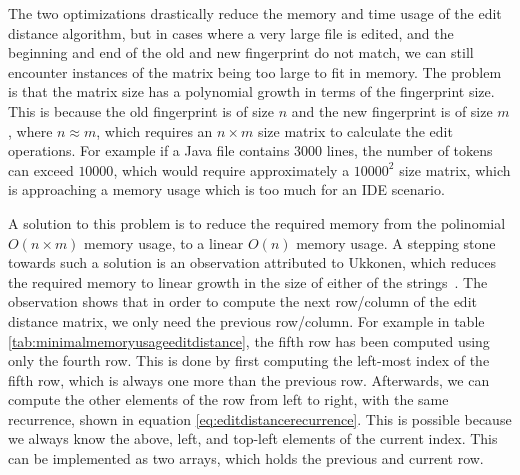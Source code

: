 The two optimizations drastically reduce the memory and time usage of the edit distance
algorithm, but in cases where a very large file is edited, and the beginning and end of
the old and new fingerprint do not match, we can still encounter instances of the matrix
being too large to fit in memory. The problem is that the matrix size has a polynomial
growth in terms of the fingerprint size. This is because the old fingerprint is of size
$n$ and the new fingerprint is of size $m$, where $n \approx m$, which requires an $n
\times m$ size matrix to calculate the edit operations. For example if a Java file
contains $3000$ lines, the number of tokens can exceed $10000$, which would require
approximately a $10000^2$ size matrix, which is approaching a memory usage which is too
much for an IDE scenario.

A solution to this problem is to reduce the required memory from the polinomial $O(n \times m)$
memory usage, to a linear $O(n)$ memory usage. A stepping stone towards such a solution is
an observation attributed to Ukkonen, which reduces the required memory to linear growth
in the size of either of the strings~\cite{UkkonenEditDistance}. The observation shows
that in order to compute the next row/column of the edit distance matrix, we only need the
previous row/column. For example in table \ref{tab:minimalmemoryusageeditdistance}, the
fifth row has been computed using only the fourth row. This is done by first computing the
left-most index of the fifth row, which is always one more than the previous row.
Afterwards, we can compute the other elements of the row from left to right, with the same
recurrence, shown in equation \ref{eq:editdistancerecurrence}. This is possible because we
always know the above, left, and top-left elements of the current index. This can be
implemented as two arrays, which holds the previous and current row. 

